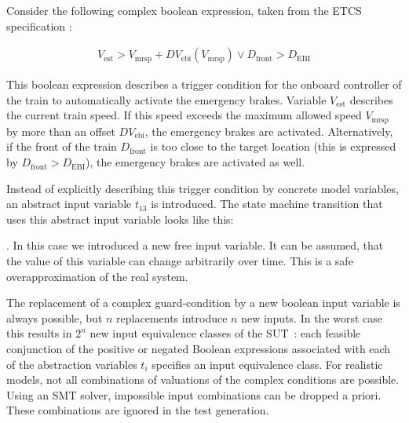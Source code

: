 \begin{example}
\label{ex:abstraction}
Consider  the following complex boolean expression, taken from the
ETCS specification \cite{ETCSSRS-Principles}:

\begin{align}
V_\text{est} > V_\text{mrsp} + DV_\text{ebi}(V_\text{mrsp}) 
\lor D_\text{front} > D_\text{EBI} 
\end{align} 

This boolean expression describes a trigger condition for the onboard controller
of the train to automatically activate the 
emergency brakes. Variable $V_\text{est}$ describes the current train
speed.
If this speed exceeds the maximum allowed speed $V_\text{mrsp}$ by more than an
offset $DV_\text{ebi}$, the emergency brakes are activated. Alternatively,
if the front of the train $D_\text{front}$ is too close
to the target location (this is expressed by $D_\text{front} > D_\text{EBI}$), the emergency brakes are
activated as well.

Instead of explicitly describing this trigger condition by concrete model variables, an abstract input variable
$t_{13}$ is introduced. The state machine transition that uses this abstract input variable looks like
this:
.
In this case we introduced a new free input variable. It can be assumed, that
the value of this variable can change arbitrarily over time. This is a safe
overapproximation of the real system.
\end{example}

The replacement of a complex guard-condition by a new boolean input
variable is always possible, but $n$ replacements introduce $n$ new inputs.
In the worst case this results in $2^n$ new input equivalence classes of the SUT~\cite{huang_complete_2014}: each feasible conjunction of the positive or negated 
Boolean expressions associated with each of the abstraction variables $t_i$ specifies
an input equivalence class.
For realistic models, 
not all combinations of valuations of the complex conditions are possible.
Using an SMT solver, impossible input combinations can be dropped a priori. These combinations
are ignored in the test generation.  

